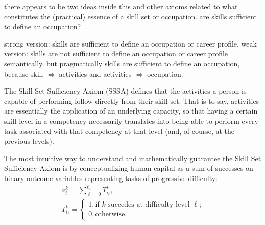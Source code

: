 \documentclass{elsarticle} %
\begin{document}
there appears to be two ideas inside this and other axioms related to what
constitutes the (practical) essence of a skill set or occupation. are skills
sufficient to define an occupation?

strong version: skills are sufficient to define an occupation or career
profile. weak version: skills are not sufficient to define an occupation or
career profile semantically, but pragmatically skills are sufficient to define
an occupation, because skill $\iff$ activities and activities $\iff$
occupation.

The Skill Set Sufficiency Axiom (SSSA) defines that the activities a person is
capable of performing follow directly from their skill set. That is to say,
activities are essentially the application of an underlying capacity, so that
having a certain skill level in a competency necessarily translates into being
able to perform every task associated with that competency at that level (and,
of course, at the previous levels).

The most intuitive way to understand and mathematically guarantee the Skill Set
Sufficiency Axiom is by conceptualizing human capital as a sum of successes on
binary outcome variables representing tasks of progressive difficulty:
\begin{gather}
    a_{i}^{k} = \sum_{\ell=0}^{\ell_i}T_{i_{\ell}}^{k}
    ,\\
    T_{i_{\ell}}^{k} =
    \begin{cases}
        1, \text{if $k$ succedes at difficulty level $\ell$;} \\
        0, \text{otherwise.}
    \end{cases}
\end{gather}
\end{document}
